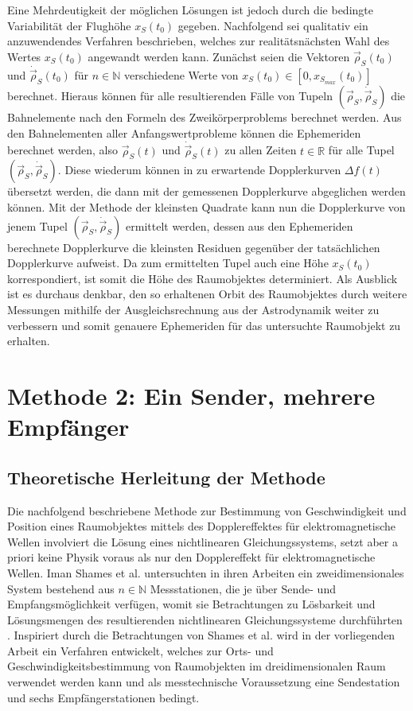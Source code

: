 \documentclass[a4paper,12pt]{article}
\numberwithin{equation}{section}
\begin{document}
Eine Mehrdeutigkeit der möglichen Lösungen ist jedoch durch die bedingte Variabilität der Flughöhe $x_S(t_0)$ gegeben. Nachfolgend sei qualitativ ein anzuwendendes Verfahren beschrieben, welches zur realitätsnächsten Wahl des Wertes $x_S(t_0)$ angewandt werden kann. Zunächst seien die Vektoren $\vec{\rho}_S(t_0)$ und $\dot{\vec{\rho}}_S(t_0)$ für $n \in \mathbb{N}$ verschiedene Werte von $x_S(t_0) \in [0, x_{S_{max}}(t_0)]$ berechnet. Hieraus können für alle resultierenden Fälle von Tupeln $(\vec{\rho }_S,\dot{\vec{\rho}}_S)$ die Bahnelemente nach den Formeln des Zweikörperproblems berechnet werden. Aus den Bahnelementen aller Anfangswertprobleme können die Ephemeriden berechnet werden, also $\vec{\rho}_S(t)$ und $\dot{\vec{\rho}}_S(t)$ zu allen Zeiten $t \in \mathbb{R}$ für alle Tupel $(\vec{\rho }_S,\dot{\vec{\rho}}_S)$. Diese wiederum können in zu erwartende Dopplerkurven $\Delta f(t)$ übersetzt werden, die dann mit der gemessenen Dopplerkurve abgeglichen werden können. Mit der Methode der kleinsten Quadrate kann nun die Dopplerkurve von jenem Tupel $(\vec{\rho }_S,\dot{\vec{\rho}}_S)$ ermittelt werden, dessen aus den Ephemeriden berechnete Dopplerkurve die kleinsten Residuen gegenüber der tatsächlichen Dopplerkurve aufweist. Da zum ermittelten Tupel auch eine Höhe $x_S(t_0)$ korrespondiert, ist somit die Höhe des Raumobjektes determiniert. Als Ausblick ist es durchaus denkbar, den so erhaltenen Orbit des Raumobjektes durch weitere Messungen mithilfe der Ausgleichsrechnung aus der Astrodynamik weiter zu verbessern und somit genauere Ephemeriden für das untersuchte Raumobjekt zu erhalten.

\newpage
\section{Methode 2: Ein Sender, mehrere Empfänger}
\subsection{Theoretische Herleitung der Methode}\label{sec:theorherlmethod2}
Die nachfolgend beschriebene Methode zur Bestimmung von Geschwindigkeit und Position eines Raumobjektes mittels des Dopplereffektes für elektromagnetische Wellen involviert die Lösung eines nichtlinearen Gleichungssystems, setzt aber a priori keine Physik voraus als nur den Dopplereffekt für elektromagnetische Wellen. Iman Shames et al. untersuchten in ihren Arbeiten ein zweidimensionales System bestehend aus $n \in \mathbb{N}$ Messstationen, die je über Sende- und Empfangsmöglichkeit verfügen, womit sie Betrachtungen zu Lösbarkeit und Lösungsmengen des resultierenden nichtlinearen Gleichungssysteme durchführten \cite[S.266]{Shames.2013}. Inspiriert durch die Betrachtungen von Shames et al. wird in der vorliegenden Arbeit ein Verfahren entwickelt, welches zur Orts- und Geschwindigkeitsbestimmung von Raumobjekten im dreidimensionalen Raum verwendet werden kann und als messtechnische Voraussetzung eine Sendestation und sechs Empfängerstationen bedingt.
\end{document}
